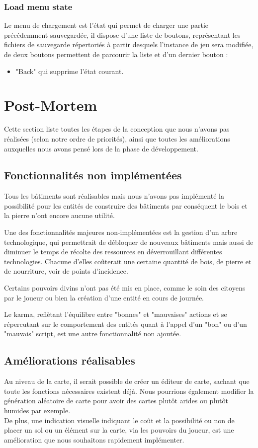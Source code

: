 \documentclass[a4paper]{memoir}
\begin{document}
			\subsection{Load menu state}
				Le menu de chargement est l’état qui permet de charger une partie précédemment sauvegardée, il dispose d’une liste de boutons, représentant les fichiers de sauvegarde répertoriés à partir desquels l’instance de jeu sera modifiée, de deux boutons permettent de parcourir la liste et d’un dernier bouton :
				\begin{itemize}[label=$\bullet$]
					\item "Back" qui supprime l’état courant.
				\end{itemize}
			
	\chapter{Post-Mortem}
		Cette section liste toutes les étapes de la conception que nous n'avons pas réalisées (selon notre ordre de priorités), ainsi que toutes les améliorations auxquelles nous avons pensé lors de la phase de développement.
		
		\section{Fonctionnalités non implémentées}
			Tous les bâtiments sont réalisables mais nous n'avons pas implémenté la possibilité pour les entités de construire des bâtiments par conséquent le bois et la pierre n'ont encore aucune utilité. 
			
			Une des fonctionnalités majeures non-implémentées est la gestion d'un arbre technologique, qui permettrait de débloquer de nouveaux bâtiments mais aussi de diminuer le temps de récolte des ressources en déverrouillant différentes technologies. Chacune d'elles coûterait une certaine quantité de bois, de pierre et de nourriture, voir de points d'incidence. 
			
			Certains pouvoirs divins n'ont pas été mis en place, comme le soin des citoyens par le joueur ou bien la création d'une entité en cours de journée. 
			
			Le karma, reflètant l'équilibre entre "bonnes" et "mauvaises" actions et se répercutant sur le comportement des entités quant à l'appel d'un "bon" ou d'un "mauvais" script, est une autre fonctionnalité non ajoutée.
			
		\section{Améliorations réalisables}
			Au niveau de la carte, il serait possible de créer un éditeur de carte, sachant que toute les fonctions nécessaires existent déjà. Nous pourrions également modifier la génération aléatoire de carte pour avoir des cartes plutôt arides ou plutôt humides par exemple.\\
			De plus, une indication visuelle indiquant le coût et la possibilité ou non de placer un sol ou un élément sur la carte, via les pouvoirs du joueur, est une amélioration que nous souhaitons rapidement implémenter.
			
\end{document}
